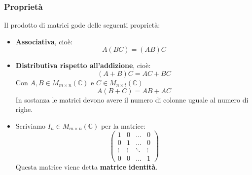 \documentclass[a4paper]{article}
\theoremstyle{break}
\theoremstyle{break}
\theoremstyle{break}
\theoremstyle{break}
\begin{document}
\subsubsection{Proprietà}
Il prodotto di matrici gode delle seguenti proprietà:
\begin{itemize}
  \item \textbf{Associativa}, cioè:
    \[
      A(BC) = (AB)C
    \] 
  \item \textbf{Distributiva rispetto all'addizione}, cioè:
    \[
      (A+B)C = AC + BC
    \] 
      Con \( A,B \in M_{m \times n}(\mathbb{C}) \) e \( C \in M_{n \times t}(\mathbb{C}) \)
      \[
      A(B+C) = AB + AC
      \] 
      In sostanza le matrici devono avere il numero di colonne uguale al numero di righe.
    \item Scriviamo \( I_n \in M_{m \times n}(\mathbb{C}) \) per la matrice:
      \[
        \begin{pmatrix} 
          1 & 0 & \ldots & 0\\
          0 & 1 & \ldots & 0\\
          \vdots & \vdots & \ddots & \vdots\\
          0 & 0 & \ldots & 1
        \end{pmatrix}
      \] 
      Questa matrice viene detta \textbf{matrice identità}.


\end{itemize}
\end{document}
